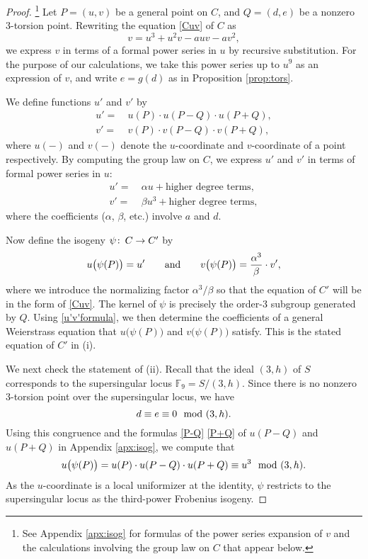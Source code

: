 \documentclass{gtpart}
\theoremstyle{definition}
\theoremstyle{remark}
\def\co{\colon\thinspace}
\newcommand{\mb}[1]{\mathbb{#1}}
\newcommand{\BF}{{\mb F}}
\newcommand{\md}{~~{\rm mod}~}
\newcommand{\ad}{{\rm and}}
\newcommand{\A}{\alpha}
\begin{document}
\begin{proof}
 \footnote{See Appendix \ref{apx:isog} for formulas of the power series expansion of $v$ and the calculations involving the group law on $C$ that appear below.  }
 Let $P = (u,v)$ be a general point on $C$, and $Q = (d,e)$ be a nonzero 3-torsion point.  
 Rewriting the equation \eqref{Cuv} of $C$ as 
 \[
  v = u^3 + u^2 v - a u v - a v^2, 
 \]
 we express $v$ in terms of a formal power series in $u$ by recursive substitution.  
 For the purpose of our calculations, we take this power series up to $u^9$ as an expression of $v$, 
 and write $e = g(d)$ as in Proposition \ref{prop:tors}.  

 We define functions $u'$ and $v'$ by 
 \begin{equation}
 \label{u'v'def}
 \begin{split}
  u' = & ~ u(P) \cdot u(P-Q) \cdot u(P+Q), \\
  v' = & ~ v(P) \cdot v(P-Q) \cdot v(P+Q), 
 \end{split}
 \end{equation}
 where $u(-)$ and $v(-)$ denote the $u$-coordinate and $v$-coordinate of a point respectively.  
 By computing the group law on $C$, we express $u'$ and $v'$ in terms of formal power series in $u$: 
 \begin{equation}
 \label{u'v'formula}
 \begin{split}
  u' = & ~ \A u + \text{higher degree terms}, \\
  v' = & ~ \beta u^3 + \text{higher degree terms}, 
 \end{split}
 \end{equation}
 where the coefficients ($\A$, $\beta$, etc.) involve $a$ and $d$.  

 Now define the isogeny $\psi \co C \to C'$ by 
 \begin{equation}
 \label{psi}
  u\big(\psi(P)\big) = u' \qquad \ad \qquad v\big(\psi(P)\big) = \frac{\A^3}{\beta} \cdot v', 
 \end{equation}
 where we introduce the normalizing factor $\A^3 / \beta$ so that the equation of $C'$ will be in the form of \eqref{Cuv}.  
 The kernel of $\psi$ is precisely the order-3 subgroup generated by $Q$.  
 Using \eqref{u'v'formula}, we then determine the coefficients of a general Weierstrass equation that $u\big(\psi(P)\big)$ and $v\big(\psi(P)\big)$ satisfy.  
 This is the stated equation of $C'$ in (i).  

 We next check the statement of (ii).  
 Recall that the ideal $(3,h)$ of $S$ corresponds to the supersingular locus $\BF_9 = S / (3,h)$.  
 Since there is no nonzero 3-torsion point over the supersingular locus, we have 
 \[
  d \equiv e \equiv 0 \md (3,h).  
 \]
 Using this congruence and the formulas \eqref{P-Q} \eqref{P+Q} of $u(P-Q)$ and $u(P+Q)$ in Appendix \ref{apx:isog}, we compute that 
 \begin{equation}
 \label{deffrob}
  u\big(\psi(P)\big) = u(P) \cdot u(P-Q) \cdot u(P+Q) \equiv u^3 \md (3,h).  
 \end{equation}
 As the $u$-coordinate is a local uniformizer at the identity, $\psi$ restricts to the supersingular locus as the third-power Frobenius isogeny.  


\end{proof}
\end{document}
